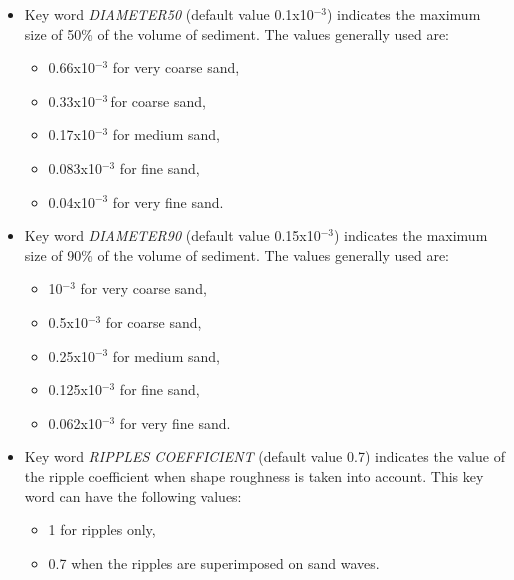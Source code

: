 \begin{itemize}
\item  Key word \textit{DIAMETER50} (default value 0.1x10${}^{-3}$) indicates
  the maximum size of 50\% of the volume of sediment. The values generally used
    are:

\begin{itemize}
\item  0.66x10${}^{-3}$ for very coarse sand,

\item  0.33x10${}^{-3\ }$for coarse sand,

\item  0.17x10${}^{-3}$ for medium sand,

\item  0.083x10${}^{-3}$ for fine sand,

\item  0.04x10${}^{-3}$ for very fine sand.
\end{itemize}

\item  Key word \textit{DIAMETER90} (default value 0.15x10${}^{-3}$) indicates
  the maximum size of 90\% of the volume of sediment. The values generally used
    are:

\begin{itemize}
\item  10${}^{-3}$ for very coarse sand,

\item  0.5x10${}^{-3}$ for coarse sand,

\item  0.25x10${}^{-3}$ for medium sand,

\item  0.125x10${}^{-3}$ for fine sand,

\item  0.062x10${}^{-3}$ for very fine sand.
\end{itemize}

\item  Key word \textit{RIPPLES COEFFICIENT} (default value 0.7) indicates the
  value of the ripple coefficient when shape roughness is taken into account.
    This key word can have the following values:

\begin{itemize}
\item  1 for ripples only,

\item  0.7 when the ripples are superimposed on sand waves.
\end{itemize}
\end{itemize}


